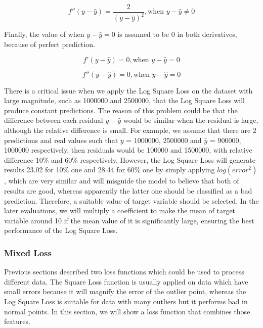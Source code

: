 \documentclass[runningheads]{llncs}
\begin{document}
\begin{equation}
  f''(y - \hat{y})= \frac{2}{(y - \hat{y})^2}, \text{when } y-\hat{y} \neq 0
\end{equation}

Finally, the value of when $y - \hat{y} = 0$ is assumed to be 0 in both derivatives, because of perfect prediction.

\begin{equation}
  f'(y - \hat{y})= 0, \text{when } y-\hat{y} = 0
\end{equation}

\begin{equation}
  f''(y - \hat{y})= 0, \text{when } y-\hat{y} = 0
\end{equation}

There is a critical issue when we apply the Log Square Loss on the dataset with large magnitude, such as 1000000 and 2500000, that the Log Square Loss will produce constant predictions. The reason of this problem could be that the difference between each residual $y - \hat{y}$ would be similar when the residual is large, although the relative difference is small. For example, we assume that there are 2 predictions and real values such that $y$ = 1000000, 2500000 and $\hat{y}$ = 900000, 1000000 respectively, then residuals would be 100000 and 1500000, with relative difference 10\% and 60\% respectively. However, the Log Square Loss will generate results 23.02 for 10\% one and 28.44 for 60\% one by simply applying $log(error^2)$, which are very similar and will misguide the model to believe that both of results are good, whereas apparently the latter one should be classified as a bad prediction. Therefore, a suitable value of target variable should be selected. In the later evaluations, we will multiply a coefficient to make the mean of target variable around 10 if the mean value of it is significantly large, ensuring the best performance of the Log Square Loss.
\subsubsection{Mixed Loss}
Previous sections described two loss functions which could be used to process different data. The Square Loss function is usually applied on data which have small errors because it will magnify the error of the outlier point, whereas the Log Square Loss is suitable for data with many outliers but it performs bad in normal points. In this section, we will show a loss function that combines those features.
\end{document}

